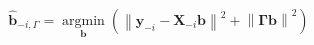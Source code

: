 \documentclass[10pt]{article}
\begin{document}
\begin{align*}\boldsymbol{\hat{b}}_{-i,\Gamma}= \operatorname*{argmin}_{\boldsymbol b} \left( \left\lVert \boldsymbol{y}_{-i} - \boldsymbol{X}_{-i} \boldsymbol b \right\rVert^2 + \left\lVert \boldsymbol \Gamma \boldsymbol b \right\rVert^2 \right)
\end{align*}
\end{document}
